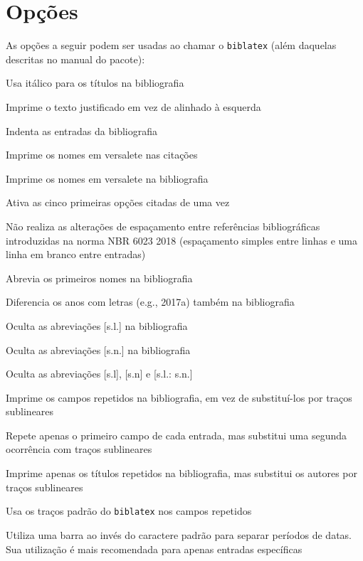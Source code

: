 \documentclass[a4paper]{article}
\begin{document}
\clearpage
\section{Opções}%
\label{sec:opções}

As opções a seguir podem ser usadas ao chamar o \texttt{biblatex} (além
daquelas descritas no manual do pacote):

\begin{description}[itemindent=-1em,leftmargin=3em]%
  \item [ittitles] Usa itálico para os títulos na bibliografia
  \item [justify] Imprime o texto justificado em vez de alinhado à esquerda
  \item [indent] Indenta as entradas da bibliografia
  \item [sccite] Imprime os nomes em versalete nas citações
  \item [scbib] Imprime os nomes em versalete na bibliografia
  \item [pretty] Ativa as cinco primeiras opções citadas de uma vez
  \item [oldspacing] Não realiza as alterações de espaçamento entre
    referências bibliográficas introduzidas na norma NBR 6023 2018
    (espaçamento simples entre linhas e uma linha em branco entre
    entradas)
  \item [giveninits] Abrevia os primeiros nomes na bibliografia
  \item [extrayear] Diferencia os anos com letras (e.g., 2017a)
    também na bibliografia
  \item [nosl] Oculta as abreviações [s.l.] na bibliografia
  \item [nosn] Oculta as abreviações [s.n.] na bibliografia
  \item [noslsn] Oculta as abreviações [s.l], [s.n] e [s.l.: s.n.]
  \item [repeatfields] Imprime os campos repetidos na bibliografia, em vez de
    subs\-ti\-tu\-í-los por traços sublineares
  \item [repeatfirstfields] Repete apenas o primeiro campo de cada entrada,
    mas substitui uma segunda ocorrência com traços sublineares
  \item [repeattitles] Imprime apenas os títulos repetidos na bibliografia,
    mas substitui os autores por traços sublineares
  \item [usedashes] Usa os traços padrão do \texttt{biblatex} nos campos
    repetidos
  \item [slashdaterange] Utiliza uma barra ao invés do caractere padrão para separar períodos de datas. Sua utilização é mais recomendada para apenas entradas específicas

\end{description}
\end{document}
